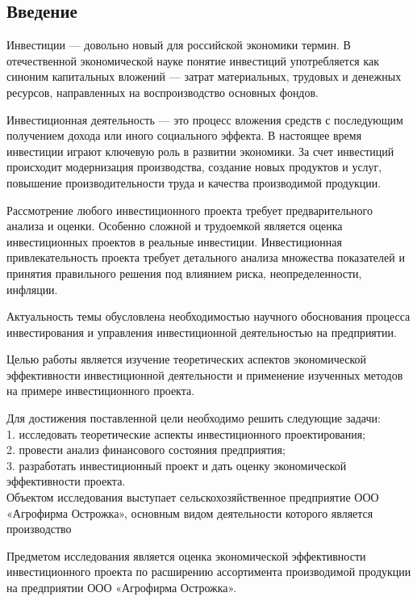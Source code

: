 \subsection*{Введение}
Инвестиции --- довольно новый для российской экономики термин. В отечественной экономической науке понятие инвестиций употребляется как синоним капитальных вложений --- затрат материальных, трудовых и денежных ресурсов, направленных на воспроизводство основных фондов.

Инвестиционная деятельность --- это процесс вложения средств с последующим получением дохода или иного социального эффекта. В настоящее время инвестиции играют ключевую роль в развитии экономики. За счет инвестиций происходит модернизация производства, создание новых продуктов и услуг, повышение производительности труда и качества производимой продукции.

Рассмотрение любого инвестиционного проекта требует предварительного анализа и оценки. Особенно сложной и трудоемкой является оценка инвестиционных проектов в реальные инвестиции. Инвестиционная привлекательность проекта требует детального анализа множества показателей и принятия правильного решения под влиянием риска, неопределенности, инфляции.

Актуальность темы обусловлена необходимостью научного обоснования процесса инвестирования и управления инвестиционной деятельностью на предприятии.

Целью работы является изучение теоретических аспектов экономической эффективности инвестиционной деятельности и применение изученных методов на примере инвестиционного проекта.

Для достижения поставленной цели необходимо решить следующие задачи:\\
1. исследовать теоретические аспекты инвестиционного проектирования;\\
2. провести анализ финансового состояния предприятия;\\
3. разработать инвестиционный проект и дать оценку экономической эффективности проекта.\\

Объектом исследования выступает сельскохозяйственное предприятие ООО «Агрофирма Острожка», основным видом деятельности которого является производство 

Предметом исследования является оценка экономической эффективности инвестиционного проекта по расширению ассортимента производимой продукции на предприятии ООО «Агрофирма Острожка».

